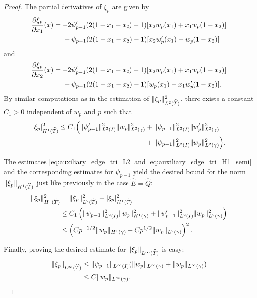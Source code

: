 \documentclass[english, 12pt, a4paper, sci, utf8, a-2b, online]{aaltothesis}
\theoremstyle{definition}
\theoremstyle{plain}
\DeclarePairedDelimiter\abs{\lvert}{\rvert}
\DeclarePairedDelimiter\norm{\lVert}{\rVert}
\numberwithin{equation}{section}
\begin{document}
\begin{proof}
    The partial derivatives of $\xi_p$ are given by
    \begin{align*}
        \frac{\partial \xi_p}{\partial x_1}(x)
        &= -2 \psi_{p-1}'(2(1-x_1-x_2)-1) [x_2 w_p(x_1) + x_1 w_p(1-x_2)] \\
        &\hspace{5mm} + \psi_{p-1}(2(1-x_1-x_2)-1) [x_2 w_p'(x_1) + w_p(1-x_2)]
    \end{align*}
    and
    \begin{align*}
        \frac{\partial \xi_p}{\partial x_2}(x)
        &= -2 \psi_{p-1}'(2(1-x_1-x_2)-1) [x_2 w_p(x_1) + x_1 w_p(1-x_2)] \\
        &\hspace{5mm} + \psi_{p-1}(2(1-x_1-x_2)-1) [w_p(x_1) - x_1 w_p'(1-x_2)].
    \end{align*}
    By similar computations as in the estimation of 
    $\norm{\xi_p}_{L^2(\widehat{T})}^2$, there exists a constant $C_1 > 0$
    independent of $w_p$ and $p$ such that
    \begin{align}
        \abs{\xi_p}_{H^1(\widehat{T})}^2
        \leq C_1 \Bigl(
            \norm{\psi_{p-1}'}_{L^2(I)}^2 \norm{w_p}_{L^2(\gamma)}^2
            &+ \norm{\psi_{p-1}}_{L^2(I)}^2 \norm{w_p'}_{L^2(\gamma)}^2 \nonumber \\
        \label{eq:auxiliary_edge_tri_H1_semi}
        &+ \norm{\psi_{p-1}}_{L^2(I)}^2 \norm{w_p}_{L^2(\gamma)}^2 \Bigr).
    \end{align}

    The estimates \eqref{eq:auxiliary_edge_tri_L2} and 
    \eqref{eq:auxiliary_edge_tri_H1_semi} and the corresponding
    estimates for $\psi_{p-1}$ yield the desired bound for the norm
    $\norm{\xi_p}_{H^1(\widehat{T})}$ just like previously in the case
    $\widehat{E} = \widehat{Q}$:
    \begin{align*}
        \norm{\xi_p}_{H^1(\widehat{T})}^2
        &= \norm{\xi_p}_{L^2(\widehat{T})}^2 + \abs{\xi_p}_{H^1(\widehat{T})}^2 \\
        &\leq C_1 \left( 
                \norm{\psi_{p-1}}_{L^2(I)}^2 \norm{w_p}_{H^1(\gamma)}^2
                + \norm{\psi_{p-1}'}_{L^2(I)}^2 \norm{w_p}_{L^2(\gamma)}^2
            \right) \\
        &\leq \left(
            C p^{-1/2} \norm{w_p}_{H^1(\gamma)} + C p^{1/2} \norm{w_p}_{L^2(\gamma)}
        \right)^2.
    \end{align*}

    Finally, proving the desired estimate for
    $\norm{\xi_p}_{L^{\infty}(\widehat{T})}$ is easy:
    \begin{align*}
        \norm{\xi_p}_{L^{\infty}(\widehat{T})}
        &\leq \norm{\psi_{p-1}}_{L^{\infty}(I)}
            (\norm{w_p}_{L^{\infty}(\gamma)} + \norm{w_p}_{L^{\infty}(\gamma)}) \\
        &\leq C \norm{w_p}_{L^{\infty}(\gamma)}.
    \end{align*}
\end{proof}
\end{document}
